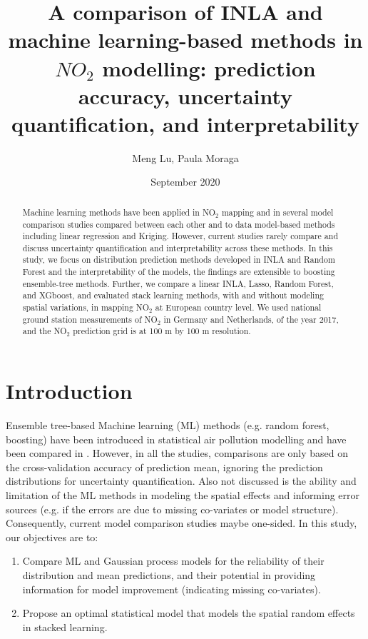 \documentclass{article}
\author{Meng Lu, Paula Moraga }
\date{September 2020}
\title{A comparison of INLA and machine learning-based methods in $NO_2$ modelling: prediction accuracy, uncertainty quantification, and interpretability }
\begin{document}
\maketitle
\begin{abstract} 
Machine learning methods have been applied in NO$_2$ mapping and in several model comparison studies compared between each other and to data model-based methods including linear regression and Kriging. However, current studies rarely compare and discuss uncertainty quantification and interpretability across these methods. In this study, we focus on distribution prediction methods developed in INLA and Random Forest and the interpretability of the models, the findings are extensible to boosting ensemble-tree methods. Further, we compare a linear INLA, Lasso, Random Forest, and XGboost, and evaluated stack learning methods, with and without modeling spatial variations, in mapping NO$_2$ at European country level. We used national ground station measurements of NO$_2$ in Germany and Netherlands, of the year 2017, and the NO$_2$ prediction grid is at 100 m by 100 m resolution.   
\end{abstract}

\section{Introduction}
Ensemble tree-based Machine learning (ML) methods (e.g. random forest, boosting) have been introduced in statistical air pollution modelling and have been compared in \cite{chen2019comparison,kerckhoffs2019performance,luglobal}. However, in all the studies, comparisons are only based on the cross-validation accuracy of prediction mean, ignoring the prediction distributions for uncertainty quantification. Also not discussed is the ability and limitation of the ML methods in modeling the spatial effects and informing error sources (e.g. if the errors are due to missing co-variates or model structure). Consequently, current model comparison studies maybe one-sided. In this study, our objectives are to:
\begin{enumerate}
    \item Compare ML and Gaussian process models for the reliability of their distribution and mean predictions, and their potential in providing information for model improvement (indicating missing co-variates).
    
    \item Propose an optimal statistical model that models the spatial random effects in stacked learning.
\end{enumerate}
\end{document}
